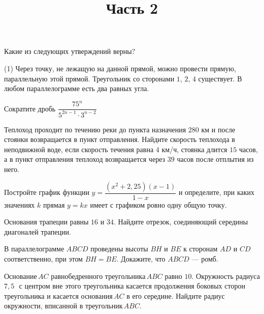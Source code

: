 \begin{training}[1]
\begin{listofex}[resume]
		\item Какие из следующих утверждений верны?
		\begin{tasks}(1)
			\task Через точку, не лежащую на данной прямой, можно провести прямую, параллельную этой
			 прямой.
			 \task Треугольник со сторонами \( 1 \), \( 2 \), \( 4 \) существует.
			 \task В любом параллелограмме есть два равных угла.
		\end{tasks}
		\foranswer
		\title{Часть 2}
		\item Сократите дробь \( \dfrac{75^n}{5^{2n-1}\cdot3^{n-2}} \)
		\item Теплоход проходит по течению реки до пункта назначения \( 280 \) км и после стоянки возвращается в пункт отправления. Найдите скорость теплохода в неподвижной воде, если скорость течения равна \( 4 \) км/ч, стоянка длится \( 15 \) часов, а в пункт отправления теплоход возвращается через \( 39 \) часов после отплытия из него.
		\item Постройте график функции \( y=\dfrac{(x^2+2,25)(x-1)}{1-x} \) и определите, при каких значениях \( k \) прямая \( y=kx \) имеет с графиком ровно одну общую точку.
		\item Основания трапеции равны \( 16 \) и \( 34 \). Найдите отрезок, соединяющий середины диагоналей трапеции.
		\item В параллелограмме \( ABCD \) проведены высоты \( BH \) и \( BE \) к сторонам \( AD \) и \( CD \) соответственно, при этом \( BH=BE \). Докажите, что \( ABCD \) --- ромб.
		\item Основание \( AC \) равнобедренного треугольника \( ABC \) равно \( 10 \). Окружность радиуса \( 7,5 \) \( \, \) с центром вне этого треугольника касается продолжения боковых сторон треугольника и касается основания \( AC \) в его середине. Найдите радиус окружности, вписанной в треугольник \( ABC \).
	\end{listofex}
\end{training}


